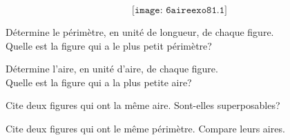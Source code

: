 \[\texttt{[image: 6aireexo81.1]}\] 
\begin{myenumerate}
\item Détermine le périmètre, en unité de longueur, de chaque figure.
  \\Quelle est la figure qui a le plus petit périmètre?
\item Détermine l'aire, en unité d'aire, de chaque figure.
  \\Quelle est la figure qui a la plus petite aire?
\item Cite deux figures qui ont la même aire. Sont-elles superposables?
\item Cite deux figures qui ont le même périmètre. Compare leurs aires.
\end{myenumerate}
